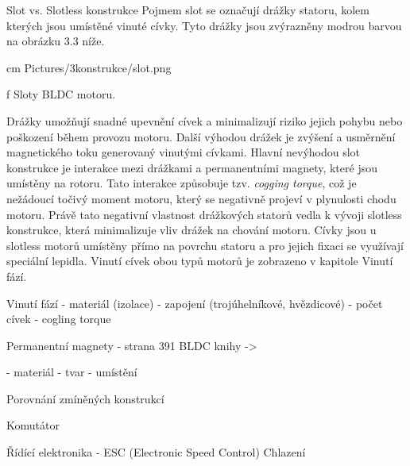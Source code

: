  \secc Slot vs. Slotless konstrukce
 Pojmem slot se označují drážky statoru, kolem kterých jsou umístěné vinuté cívky. Tyto drážky jsou zvýrazněny modrou barvou
 na obrázku 3.3 níže. 

 \medskip
  cm \cinspic Pictures/3konstrukce/slot.png 
 \caption/f Sloty BLDC motoru.
 \medskip

 Drážky umožňují snadné upevnění cívek a minimalizují riziko jejich pohybu nebo poškození během provozu motoru. 
 Další výhodou drážek je zvýšení a usměrnění magnetického toku generovaný vinutými cívkami.   
 Hlavní nevýhodou slot konstrukce je interakce mezi drážkami a permanentními magnety, které jsou umístěny na rotoru. 
 Tato interakce způsobuje tzv. {\em cogging torque}, což je nežádoucí točivý moment motoru, který se negativně projeví
  v plynulosti chodu motoru. Právě tato negativní vlastnost drážkových statorů vedla k vývoji slotless konstrukce, která
 minimalizuje vliv drážek na chování motoru. Cívky jsou u slotless motorů umístěny přímo na povrchu statoru a pro jejich fixaci se využívají
 speciální lepidla. Vinutí cívek obou typů motorů je zobrazeno v kapitole Vinutí fází.


 \sec Vinutí fází
- materiál (izolace)
- zapojení (trojúhelníkové, hvězdicové)
- počet cívek
- cogling torque 

 \sec Permanentní magnety
 - strana 391 BLDC knihy ->

- materiál
- tvar
- umístění

\sec Porovnání zmíněných konstrukcí

 \sec Komutátor

 \sec Řídící elektronika
 - ESC (Electronic Speed Control)
 \sec Chlazení

 